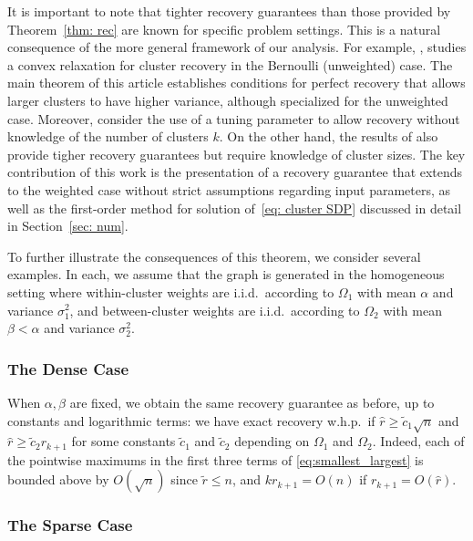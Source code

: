 \documentclass[twoside,11pt]{article}
\newcommand{\0}{\bs{0}}
\begin{document}
{It is important to note that tighter recovery guarantees than those provided by Theorem~\ref{thm: rec} are known for specific problem settings. This is a natural consequence of the more general framework of our analysis.
For example, \cite{yan2017provable}, studies a convex relaxation for cluster recovery in the Bernoulli (unweighted) case. The main theorem of this article establishes conditions for perfect recovery that allows larger clusters to have higher variance, although specialized for the unweighted case. Moreover, \cite{yan2017provable} consider the use of a tuning parameter to allow recovery without knowledge of the number of clusters $k$. On the other hand, the results of \cite{amini2014semidefinite,jalali2015relative} also provide tigher recovery guarantees but require knowledge of cluster sizes.  The key contribution of this work is the presentation of a recovery guarantee that extends to the weighted case without strict assumptions regarding input parameters, as well as the first-order method for solution of~\eqref{eq: cluster SDP} discussed in detail in Section~\ref{sec: num}.

To further illustrate the consequences of this theorem, we consider
several examples. In each, we assume that the graph is
generated in the homogeneous setting where
within-cluster weights are i.i.d.~according to $\Omega_1$ with mean $\alpha$ and variance $
\sigma_1^2$, and
between-cluster weights are i.i.d.~according to
$\Omega_2$ with mean $\beta < \alpha$ and variance $\sigma_2^2$.


\subsubsection{The Dense Case}

When \( \alpha, \beta \) are fixed, we obtain the same recovery guarantee as before, up to constants and logarithmic
terms:  we have exact recovery w.h.p.~if \(\hat r \ge \tilde c_1 \sqrt{n} \) and \(\hat r \ge \tilde c_2 r_{k+1} \)
for some constants \(\tilde c_1\) and \(\tilde c_2\) depending on \(\Omega_1\) and \(\Omega_2\).
Indeed, each of the pointwise maximums in the first  three terms
of \eqref{eq:smallest_largest} is bounded above by $O(\sqrt{n})$
since $\tilde r \le n$, and $k r_{k+1} = O(n)$ if $r_{k+1} = O(\hat r)$.

\subsubsection{The Sparse Case}

}
\end{document}
